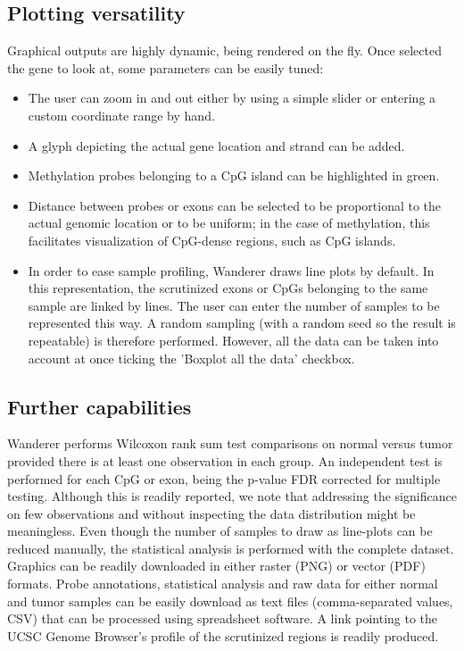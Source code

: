 \documentclass{bmcart}
\begin{document}
 
\subsection*{Plotting versatility}

Graphical outputs are highly dynamic, being rendered on the fly. Once selected the gene to look at, some parameters can be easily tuned:
\begin{itemize}
\item The user can zoom in and out either by using a simple slider or entering a custom coordinate range by hand. 
\item A glyph depicting the actual gene location and strand can be added. 
\item Methylation probes belonging to a CpG island can be highlighted in green. 
\item Distance between probes or exons can be selected to be proportional to the actual genomic location or to be uniform; in the case of methylation, this facilitates visualization of CpG-dense regions, such as CpG islands. 
\item In order to ease sample profiling, Wanderer draws line plots by default. In this representation, the scrutinized exons or CpGs belonging to the same sample are linked by lines. The user can enter the number of samples to be represented this way. A random sampling (with a random seed so the result is repeatable) is therefore performed. However, all the data can be taken into account at once ticking the 'Boxplot all the data' checkbox.

\end{itemize}


\subsection*{Further capabilities}
Wanderer performs Wilcoxon rank sum test comparisons on normal versus tumor provided there is at least one observation in each group. An independent test is performed for each CpG or exon, being the p-value FDR corrected for multiple testing. Although this is readily reported, we note that addressing the significance on few observations and without inspecting the data distribution might be meaningless. Even though the number of samples to draw as line-plots can be reduced manually, the statistical analysis is performed with the complete dataset.\\

Graphics can be readily downloaded in either raster (PNG) or vector (PDF) formats. Probe annotations, statistical analysis and raw data for either normal and tumor samples can be easily download as text files (comma-separated values, CSV) that can be processed using spreadsheet software. A link pointing to the UCSC Genome Browser's profile of the scrutinized regions is readily produced.\\
\end{document}
